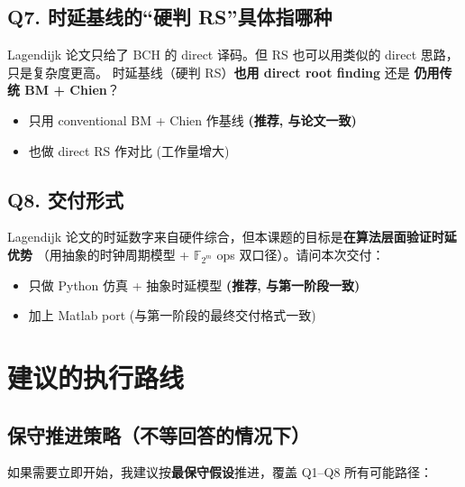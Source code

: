 \documentclass[11pt,a4paper]{article}
\begin{document}
\subsection{Q7. 时延基线的``硬判 RS''具体指哪种}

\begin{actionbox}[title=\textbf{Q7. 硬判 RS 是否使用 Lagendijk 类似的 direct root finding？}]
Lagendijk 论文只给了 BCH 的 direct 译码。但 RS 也可以用类似的 direct 思路，只是复杂度更高。
时延基线（硬判 RS）\textbf{也用 direct root finding} 还是 \textbf{仍用传统 BM + Chien}？

\begin{itemize}[leftmargin=1em, itemsep=1pt]
\item [(a)] 只用 conventional BM + Chien 作基线 \textbf{(推荐, 与论文一致)}
\item [(b)] 也做 direct RS 作对比 (工作量增大)
\end{itemize}
\end{actionbox}

\subsection{Q8. 交付形式}

\begin{actionbox}[title=\textbf{Q8. Python vs Matlab？}]
Lagendijk 论文的时延数字来自硬件综合，但本课题的目标是\textbf{在算法层面验证时延优势}
（用抽象的时钟周期模型 + $\mathbb{F}_{2^m}$ ops 双口径）。请问本次交付：

\begin{itemize}[leftmargin=1em, itemsep=1pt]
\item [(a)] 只做 Python 仿真 + 抽象时延模型 \textbf{(推荐, 与第一阶段一致)}
\item [(b)] 加上 Matlab port (与第一阶段的最终交付格式一致)
\end{itemize}
\end{actionbox}

\section{建议的执行路线}

\subsection{保守推进策略（不等回答的情况下）}

如果需要立即开始，我建议按\textbf{最保守假设}推进，覆盖 Q1--Q8 所有可能路径：
\end{document}
